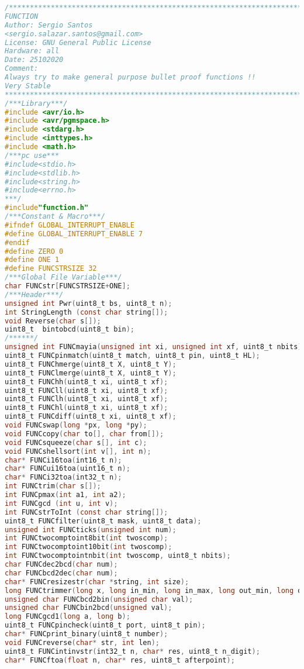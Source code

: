 \begin{lstlisting}[language=C]
/*************************************************************************
FUNCTION
Author: Sergio Santos
<sergio.salazar.santos@gmail.com> 
License: GNU General Public License
Hardware: all
Date: 25102020
Comment:
Always try to make general purpose bullet proof functions !!
Very Stable
*************************************************************************/
/***Library***/
#include <avr/io.h>
#include <avr/pgmspace.h>
#include <stdarg.h>
#include <inttypes.h>
#include <math.h>
/***pc use***
#include<stdio.h>
#include<stdlib.h>
#include<string.h>
#include<errno.h>
***/
#include"function.h"
/***Constant & Macro***/
#ifndef GLOBAL_INTERRUPT_ENABLE
#define GLOBAL_INTERRUPT_ENABLE 7
#endif
#define ZERO 0
#define ONE 1
#define FUNCSTRSIZE 32
/***Global File Variable***/
char FUNCstr[FUNCSTRSIZE+ONE];
/***Header***/
unsigned int Pwr(uint8_t bs, uint8_t n);
int StringLength (const char string[]);
void Reverse(char s[]);
uint8_t  bintobcd(uint8_t bin);
/******/
unsigned int FUNCmayia(unsigned int xi, unsigned int xf, uint8_t nbits);
uint8_t FUNCpinmatch(uint8_t match, uint8_t pin, uint8_t HL);
uint8_t FUNChmerge(uint8_t X, uint8_t Y);
uint8_t FUNClmerge(uint8_t X, uint8_t Y);
uint8_t FUNChh(uint8_t xi, uint8_t xf);
uint8_t FUNCll(uint8_t xi, uint8_t xf);
uint8_t FUNClh(uint8_t xi, uint8_t xf);
uint8_t FUNChl(uint8_t xi, uint8_t xf);
uint8_t FUNCdiff(uint8_t xi, uint8_t xf);
void FUNCswap(long *px, long *py);
void FUNCcopy(char to[], char from[]);
void FUNCsqueeze(char s[], int c);
void FUNCshellsort(int v[], int n);
char* FUNCi16toa(int16_t n);
char* FUNCui16toa(uint16_t n);
char* FUNCi32toa(int32_t n);
int FUNCtrim(char s[]);
int FUNCpmax(int a1, int a2);
int FUNCgcd (int u, int v);
int FUNCstrToInt (const char string[]);
uint8_t FUNCfilter(uint8_t mask, uint8_t data);
unsigned int FUNCticks(unsigned int num);
int FUNCtwocomptoint8bit(int twoscomp);
int FUNCtwocomptoint10bit(int twoscomp);
int FUNCtwocomptointnbit(int twoscomp, uint8_t nbits);
char FUNCdec2bcd(char num);
char FUNCbcd2dec(char num);
char* FUNCresizestr(char *string, int size);
long FUNCtrimmer(long x, long in_min, long in_max, long out_min, long out_max);
unsigned char FUNCbcd2bin(unsigned char val);
unsigned char FUNCbin2bcd(unsigned val);
long FUNCgcd1(long a, long b);
uint8_t FUNCpincheck(uint8_t port, uint8_t pin);
char* FUNCprint_binary(uint8_t number);
void FUNCreverse(char* str, int len);
uint8_t FUNCintinvstr(int32_t n, char* res, uint8_t n_digit);
char* FUNCftoa(float n, char* res, uint8_t afterpoint);

\end{lstlisting}
